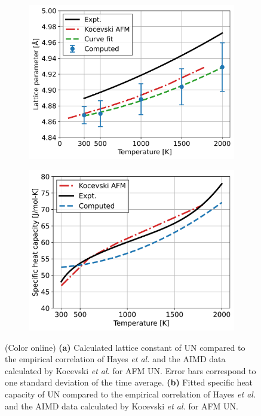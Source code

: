 \documentclass[preprint, 12pt]{elsarticle}
\newcommand{\?}{\stackrel{?}{=}}
\begin{document}
\begin{figure}[h!]
\centering
\begin{subfigure}{0.48\textwidth}
    \includegraphics[width=\textwidth]{LatConst.png}
    \caption{}
    \label{Fig:LatConst}
\end{subfigure}
\hfill
\begin{subfigure}{0.48\textwidth}
    \includegraphics[width=\textwidth]{CP.png}
    \caption{}
    \label{Fig:CP}
\end{subfigure}
\caption{(Color online) \textbf{(a)} Calculated lattice constant of UN compared to the empirical correlation of Hayes \textit{et al.} \cite{Hayes1990I} and the AIMD data calculated by Kocevski \textit{et al.} \cite{Kocevski2023} for AFM UN. Error bars correspond to one standard deviation of the time average. \textbf{(b)} Fitted specific heat capacity of UN compared to the empirical correlation of Hayes \textit{et al.} \cite{Hayes1990IV} and the AIMD data calculated by Kocevski \textit{et al.} for AFM UN.}
\end{figure}
\end{document}

